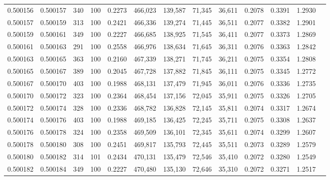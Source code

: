\begin{tabular}{rrrrrrrrrrrrr}
0.500156 & 0.500157 &   340 & 100 &                                     0.2273 & 466,023 & 139,587 &  71,345 &  36,611 & 0.2078 & 0.3391 & 1.2930 \\
0.500157 & 0.500159 &   313 & 100 &                                     0.2421 & 466,336 & 139,274 &  71,445 &  36,511 & 0.2077 & 0.3382 & 1.2901 \\
0.500159 & 0.500161 &   349 & 100 &                                     0.2227 & 466,685 & 138,925 &  71,545 &  36,411 & 0.2077 & 0.3373 & 1.2869 \\
0.500161 & 0.500163 &   291 & 100 &                                     0.2558 & 466,976 & 138,634 &  71,645 &  36,311 & 0.2076 & 0.3363 & 1.2842 \\
0.500163 & 0.500165 &   363 & 100 &                                     0.2160 & 467,339 & 138,271 &  71,745 &  36,211 & 0.2075 & 0.3354 & 1.2808 \\
0.500165 & 0.500167 &   389 & 100 &                                     0.2045 & 467,728 & 137,882 &  71,845 &  36,111 & 0.2075 & 0.3345 & 1.2772 \\
0.500167 & 0.500170 &   403 & 100 &                                     0.1988 & 468,131 & 137,479 &  71,945 &  36,011 & 0.2076 & 0.3336 & 1.2735 \\
0.500170 & 0.500172 &   323 & 100 &                                     0.2364 & 468,454 & 137,156 &  72,045 &  35,911 & 0.2075 & 0.3326 & 1.2705 \\
0.500172 & 0.500174 &   328 & 100 &                                     0.2336 & 468,782 & 136,828 &  72,145 &  35,811 & 0.2074 & 0.3317 & 1.2674 \\
0.500174 & 0.500176 &   403 & 100 &                                     0.1988 & 469,185 & 136,425 &  72,245 &  35,711 & 0.2075 & 0.3308 & 1.2637 \\
0.500176 & 0.500178 &   324 & 100 &                                     0.2358 & 469,509 & 136,101 &  72,345 &  35,611 & 0.2074 & 0.3299 & 1.2607 \\
0.500178 & 0.500180 &   308 & 100 &                                     0.2451 & 469,817 & 135,793 &  72,445 &  35,511 & 0.2073 & 0.3289 & 1.2579 \\
0.500180 & 0.500182 &   314 & 101 &                                     0.2434 & 470,131 & 135,479 &  72,546 &  35,410 & 0.2072 & 0.3280 & 1.2549 \\
0.500182 & 0.500184 &   349 & 100 &                                     0.2227 & 470,480 & 135,130 &  72,646 &  35,310 & 0.2072 & 0.3271 & 1.2517 \\

\end{tabular}
